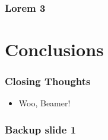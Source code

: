 \documentclass{beamer}
\begin{document}
		\begin{frame}
			\frametitle{Lorem 3}
			\blindtext
		\end{frame}

	\section{Conclusions}
		\begin{frame}
			\frametitle{Closing Thoughts}
			\begin{itemize}
				\item Woo, Beamer!
			\end{itemize}
		\end{frame}
	
	\appendix
	\backupbegin
	  \begin{frame}
	    \frametitle{Backup slide 1}
	    \blindtext
	  \end{frame}
	\backupend
\end{document}
